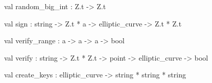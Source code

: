 \documentclass[11pt]{article}
\begin{document}
\begin{ocamldocsigend}
\label{val:Ecc.Ecc.random-underscorebig-underscoreint}\begin{ocamldoccode}
val random_big_int : Z.t -> Z.t
\end{ocamldoccode}


\label{val:Ecc.Ecc.sign}\begin{ocamldoccode}
val sign : string -> Z.t * {\textquotesingle}a -> elliptic_curve -> Z.t * Z.t
\end{ocamldoccode}


\label{val:Ecc.Ecc.verify-underscorerange}\begin{ocamldoccode}
val verify_range : {\textquotesingle}a -> {\textquotesingle}a -> {\textquotesingle}a -> bool
\end{ocamldoccode}


\label{val:Ecc.Ecc.verify}\begin{ocamldoccode}
val verify : string -> Z.t * Z.t -> point -> elliptic_curve -> bool
\end{ocamldoccode}


\label{val:Ecc.Ecc.create-underscorekeys}\begin{ocamldoccode}
val create_keys : elliptic_curve -> string * string * string
\end{ocamldoccode}
\end{ocamldocsigend}
\end{document}
